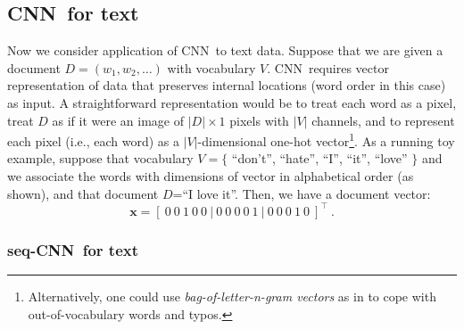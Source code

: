 \documentclass[11pt,letterpaper]{article}
\newcommand{\cnn}{CNN}
\newcommand{\scnn}{seq-CNN}
\newcommand{\bx}{{\mathbf x}}
\newcommand{\doc}{D}
\newcommand{\voc}{V}
\newcommand{\vsz}{|\voc|}
\newcommand{\wrd}{w}
\newcommand{\dsz}{|\doc|}
\newcommand{\bEqsz}{\begin{small}}
\newcommand{\eEqsz}{\end{small}}
\begin{document}


\subsection{\cnn\ for text} 
\label{sec:cnn-text}

Now we consider application of \cnn\ to text data.  
Suppose that we are given a document $\doc=(\wrd_1, \wrd_2, \ldots)$ with vocabulary 
$\voc$.  
\cnn\ requires vector representation of data that preserves internal locations (word order in this case) 
as input.  
A straightforward representation 
would be to treat each word as a pixel, treat 
$\doc$ as if it were an image of $\dsz \times 1$ pixels with $\vsz$ channels, 
and to represent each pixel (i.e., each word) as a $\vsz$-dimensional one-hot vector\footnote{
  Alternatively, one could use {\em bag-of-letter-n-gram vectors} as in \cite{Shen+etal14,Gao+etal14} 
  to cope with out-of-vocabulary words and typos.  
}. 
As a running toy example, 
suppose that vocabulary $\voc=\{$ ``don't'', ``hate'', ``I'', ``it'', ``love'' $\}$ 
and we associate the words with dimensions of vector in alphabetical order (as shown), 
and that document $\doc$=``I love it''.  
Then, we have a document vector: 
\vspace{-0.1in}
\[
  \bx=\left[~0~0~1~0~0~|~0~0~0~0~1~|~0~0~0~1~0~\right]^\top~. 
\]

\subsubsection{\scnn\ for text}
\label{sec:scnn}
\end{document}
